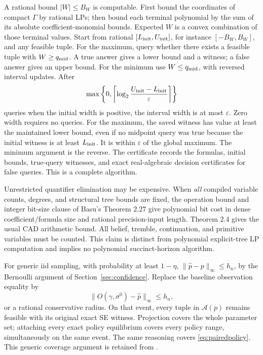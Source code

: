 \documentclass[11pt,a4paper]{article}
\numberwithin{equation}{section}
\theoremstyle{definition}
\begin{document}
A rational bound \(|W|\le B_W\) is computable.
First bound the coordinates of compact \(\Gamma\) by rational LPs;
then bound each terminal polynomial by the sum of its absolute
coefficient-monomial bounds. Expected \(W\) is a convex combination
of those terminal values.
Start from rational \([L_{\rm init},U_{\rm init}]\), for instance
\([-B_W,B_W]\), and any feasible tuple.
For the maximum, query whether there exists a feasible tuple with
\(W\ge q_{\rm mid}\). A true answer gives a lower bound and a
witness; a false answer gives an upper bound. For the minimum use
\(W\le q_{\rm mid}\), with reversed interval updates.
After
\begin{equation}\label{eq:bisectcount}
 \max\left\{0,\left\lceil
       \log_2\frac{U_{\rm init}-L_{\rm init}}{\varepsilon}
                     \right\rceil\right\}
\end{equation}
queries when the initial width is positive, the interval width is
at most \(\varepsilon\). Zero width requires no queries.
For the maximum, the saved witness has value at least the maintained
lower bound, even if no midpoint query was true because the initial
witness is at least \(L_{\rm init}\). It is within \(\varepsilon\)
of the global maximum. The minimum argument is the reverse.
The certificate records the formulas, initial bounds, true-query
witnesses, and exact real-algebraic decision certificates for false
queries. This is a complete algorithm.

Unrestricted quantifier elimination may be expensive.
When \emph{all} compiled variable counts, degrees, and structural
tree bounds are fixed, the operation bound and integer bit-size clause
of Basu's Theorem 2.27 \cite[p.~16]{Basu} give polynomial bit cost
in dense coefficient/formula size and rational precision-input length.
Theorem 2.4 \cite[p.~6]{Basu} gives the usual CAD arithmetic bound.
All belief, tremble, continuation, and primitive variables must be
counted. This claim is distinct from polynomial explicit-tree LP
computation and implies no polynomial succinct-horizon algorithm.

For generic iid sampling, with probability at least \(1-\eta\),
\(\|\widehat p-p\|_\infty\le h_n\), by the Bernoulli argument
of Section~\ref{sec:confidence}. Replace the baseline observation
equality by
\[
 \|O(\gamma,\sigma^0)-\widehat p\|_\infty\le h_n,
\]
or a rational conservative radius. On that event, every tuple in
\(\mathcal A(p)\) remains feasible with its original exact SE witness.
Projection covers the whole parameter set; attaching every exact
policy equilibrium covers every policy range, simultaneously on the
same event. The same reasoning covers \eqref{eq:pairedpolicy}.
This generic coverage argument is retained from \cite{Prior}.
\end{document}
